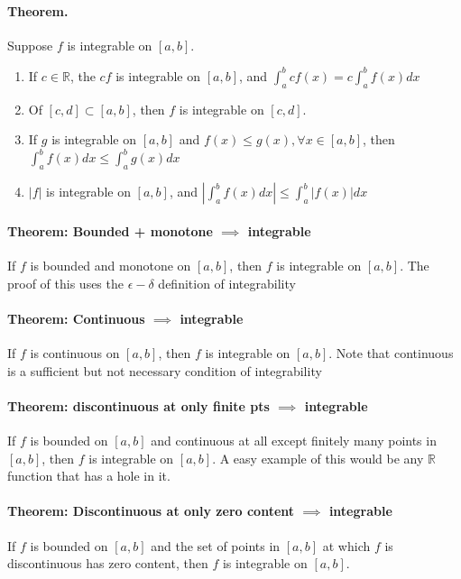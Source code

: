 \documentclass[11pt]{article}
\begin{document}
\paragraph{Theorem.} Suppose $f$ is integrable on $[a,b]$.
\begin{enumerate}
    \item If $c\in \mathbb{R}$, the $cf$ is integrable on $[a,b]$, and $\int_a^b cf(x) = c\int_a^bf(x)dx$
    \item Of $[c,d] \subset [a,b]$, then $f$ is integrable on $[c,d]$.
    \item If $g$ is integrable on $[a,b]$ and $f(x) \leq g(x),\forall x \in [a,b]$, then $\int_a^b f(x)dx\leq \int_a^b g(x)dx$
    \item $|f|$ is integrable on $[a,b]$, and $|\int_a^bf(x)dx| \leq \int_a^b |f(x)|dx$
\end{enumerate}

\paragraph{Theorem: Bounded + monotone $\implies$ integrable} If $f$ is bounded and monotone on $[a,b]$, then $f$ is integrable on $[a,b]$. The proof of this uses the $\epsilon-\delta$ definition of integrability

\paragraph{Theorem: Continuous $\implies$ integrable} If $f$ is continuous on $[a,b]$, then $f$ is integrable on $[a,b]$. Note that continuous is a sufficient but not necessary condition of integrability

\paragraph{Theorem: discontinuous at only finite pts $\implies$ integrable} If $f$ is bounded on $[a,b]$ and continuous at all except finitely many points in $[a,b]$, then $f$ is integrable on $[a,b]$. A easy example of this would be any $\mathbb{R}$ function that has a hole in it.

\paragraph{Theorem: Discontinuous at only zero content $\implies$ integrable} If $f$ is bounded on $[a,b]$ and the set of points in $[a,b]$ at which $f$ is discontinuous has zero content, then $f$ is integrable on $[a,b]$.
\end{document}
